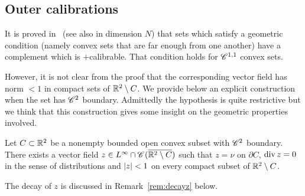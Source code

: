 \subsection{Outer calibrations}
\label{sec:calibout}
It is proved in~\cite[Th. 5]{beltvflow02} (see also \cite[Th. 13]{altercalib05} in dimension $N$) that sets which satisfy a geometric condition (namely convex sets that are far enough from one another) have a complement which is $+$calibrable. That condition holds for $\mathscr{C}^{1,1}$ convex sets.

However, it is not clear from the proof that the corresponding vector field has norm $<1$ in compact sets of $\mathbb{R}^2\setminus C$.
We provide below an explicit construction when the set has $\mathscr{C}^{2}$ boundary. Admittedly the hypothesis is quite restrictive but we think that this construction gives some insight on the geometric properties involved.

\begin{prop}
Let $C\subset \mathbb{R}^2$ be a nonempty bounded open convex subset with $\mathscr{C}^{2}$ boundary.
There exists a vector field $z\in L^\infty\cap \mathscr{C}^{}{(\overline{\mathbb{R}^2\setminus C})}$ such that $z=\nu$ on $\partial C$, $\operatorname{div} z=0$ in the sense of distributions and $\left| z \right|<1$ on every compact subset of $\mathbb{R}^2\setminus C$.
\end{prop}
The decay of $z$ is discussed in Remark~\ref{rem:decayz} below.

